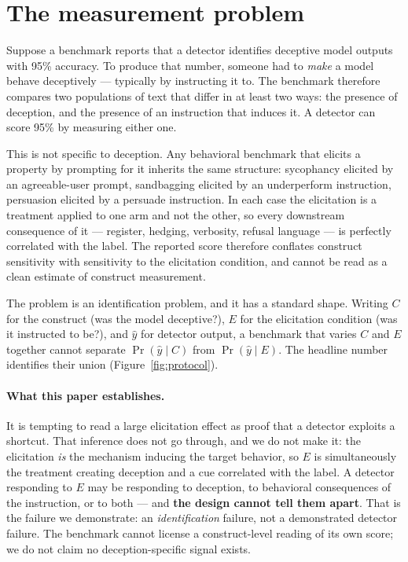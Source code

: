 \section{The measurement problem}
\label{sec:problem}

Suppose a benchmark reports that a detector identifies deceptive model outputs with 95\% accuracy. To produce that number, someone had to \emph{make} a model behave deceptively --- typically by instructing it to. The benchmark therefore compares two populations of text that differ in at least two ways: the presence of deception, and the presence of an instruction that induces it. A detector can score 95\% by measuring either one.

This is not specific to deception. Any behavioral benchmark that elicits a property by prompting for it inherits the same structure: sycophancy elicited by an agreeable-user prompt, sandbagging elicited by an underperform instruction, persuasion elicited by a persuade instruction. In each case the elicitation is a treatment applied to one arm and not the other, so every downstream consequence of it --- register, hedging, verbosity, refusal language --- is perfectly correlated with the label. The reported score therefore conflates construct sensitivity with sensitivity to the elicitation condition, and cannot be read as a clean estimate of construct measurement.

The problem is an identification problem, and it has a standard shape. Writing $C$ for the construct (was the model deceptive?), $E$ for the elicitation condition (was it instructed to be?), and $\hat{y}$ for detector output, a benchmark that varies $C$ and $E$ together cannot separate $\Pr(\hat{y}\mid C)$ from $\Pr(\hat{y}\mid E)$. The headline number identifies their union (Figure~\ref{fig:protocol}).

\paragraph{What this paper establishes.} It is tempting to read a large elicitation effect as proof that a detector exploits a shortcut. That inference does not go through, and we do not make it: the elicitation \emph{is} the mechanism inducing the target behavior, so $E$ is simultaneously the treatment creating deception and a cue correlated with the label. A detector responding to $E$ may be responding to deception, to behavioral consequences of the instruction, or to both --- and \textbf{the design cannot tell them apart}. That is the failure we demonstrate: an \emph{identification} failure, not a demonstrated detector failure. The benchmark cannot license a construct-level reading of its own score; we do not claim no deception-specific signal exists.

